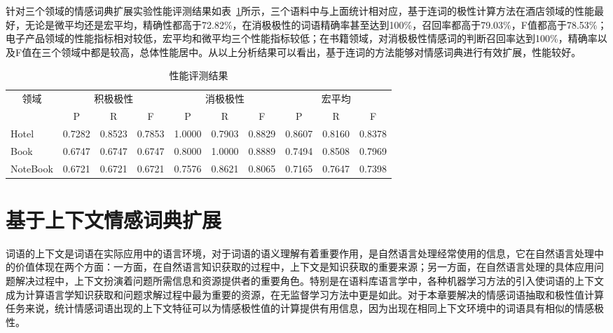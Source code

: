 针对三个领域的情感词典扩展实验性能评测结果如表~\ref{tab3-2-1}所示，三个语料中与上面统计相对应，基于连词的极性计算方法在酒店领域的性能最好，无论是微平均还是宏平均，精确性都高于72.82\%，在消极极性的词语精确率甚至达到100\%，召回率都高于79.03\%，F值都高于78.53\%；电子产品领域的性能指标相对较低，宏平均和微平均三个性能指标较低；在书籍领域，对消极极性情感词的判断召回率达到100\%，精确率以及F值在三个领域中都是较高，总体性能居中。从以上分析结果可以看出，基于连词的方法能够对情感词典进行有效扩展，性能较好。
\begin{table}[htp]
\centering
\caption{性能评测结果}
\label{tab3-2-1}
\begin{tabular}{|l|l|l|l|l|l|l|l|l|l|}
\hline
\multicolumn{1}{|c|}{\multirow{2}{*}{领域}} & \multicolumn{3}{c|}{积极极性} & \multicolumn{3}{c|}{消极极性} & \multicolumn{3}{c|}{宏平均} \\ \cline{2-10} 
\multicolumn{1}{|c|}{} & \multicolumn{1}{c|}{P} & \multicolumn{1}{c|}{R} & \multicolumn{1}{c|}{F} & \multicolumn{1}{c|}{P} & \multicolumn{1}{c|}{R} & \multicolumn{1}{c|}{F} & \multicolumn{1}{c|}{P} & \multicolumn{1}{c|}{R} & \multicolumn{1}{c|}{F} \\ \hline
Hotel & 0.7282 & 0.8523 & 0.7853 & 1.0000 & 0.7903 & 0.8829 & 0.8607 & 0.8160 & 0.8378 \\ \hline
Book & 0.6747 & 0.6747 & 0.6747 & 0.8000 & 1.0000 & 0.8889 & 0.7494 & 0.8508 & 0.7969 \\ \hline
NoteBook & 0.6721 & 0.6721 & 0.6721 & 0.7576 & 0.8621 & 0.8065 & 0.7165 & 0.7647 & 0.7398 \\ \hline
\end{tabular}
\end{table}

\section{基于上下文情感词典扩展}
词语的上下文是词语在实际应用中的语言环境，对于词语的语义理解有着重要作用，是自然语言处理经常使用的信息，它在自然语言处理中的价值体现在两个方面：一方面，在自然语言知识获取的过程中，上下文是知识获取的重要来源；另一方面，在自然语言处理的具体应用问题解决过程中，上下文扮演着问题所需信息和资源提供者的重要角色。特别是在语料库语言学中，各种机器学习方法的引入使词语的上下文成为计算语言学知识获取和问题求解过程中最为重要的资源，在无监督学习方法中更是如此。对于本章要解决的情感词语抽取和极性值计算任务来说，统计情感词语出现的上下文特征可以为情感极性值的计算提供有用信息，因为出现在相同上下文环境中的词语具有相似的情感极性。

